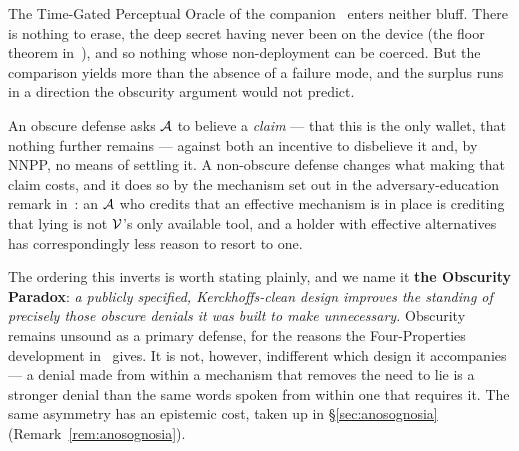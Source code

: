 \begin{remark}
\label{rem:obscurity-paradox}
The Time-Gated Perceptual Oracle of the companion~\cite[\S4]{deadly-race} enters neither
bluff. There is nothing to erase, the deep secret having
never been on the device (the floor theorem in~\cite{deadly-race}), and so nothing whose
non-deployment can be coerced. But the comparison yields more than the absence
of a failure mode, and the surplus runs in a direction the obscurity argument
would not predict.

An obscure defense asks $\mathcal{A}$ to believe a \emph{claim} --- that this is
the only wallet, that nothing further remains --- against both an incentive to
disbelieve it and, by NNPP, no means of settling it. A non-obscure defense
changes what making that claim costs, and it does so by the mechanism set out in
the adversary-education remark in~\cite{deadly-race}: an $\mathcal{A}$ who credits that an
effective mechanism is in place is crediting that lying is not $\mathcal{V}$'s only
available tool, and a holder with effective alternatives has correspondingly
less reason to resort to one.

The ordering this inverts is worth stating plainly, and we name it \textbf{the
Obscurity Paradox}: \emph{a publicly specified, Kerckhoffs-clean design improves
the standing of precisely those obscure denials it was built to make
unnecessary.} Obscurity remains unsound as a primary defense, for the reasons
the Four-Properties development in~\cite{deadly-race} gives. It is not, however, indifferent which design it
accompanies --- a denial made from within a mechanism that removes the need to
lie is a stronger denial than the same words spoken from within one that
requires it. The same asymmetry has an epistemic cost, taken up in \S\ref{sec:anosognosia}
(Remark~\ref{rem:anosognosia}).
\end{remark}
